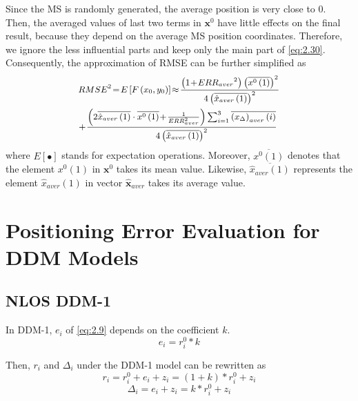 \documentclass[journal]{IEEEtran}
\begin{document}
Since the MS is randomly generated, the average position is very close to 0. Then, the averaged values of last two terms in $\mathbf{x}^0$ have little effects on the final result, because they depend on the average MS position coordinates. Therefore, we ignore the less influential parts and keep only the main part of \eqref{eq:2.30}. Consequently, the approximation of RMSE can be further simplified as
   \begin{equation}\label{eq:31}
      \begin{small}
      \begin{aligned}
      & RMSE^2 \!=\! E\left[F\left(x_0,y_0\right)\right]\!\approx\! \frac{\left( 1\!+\! {{ERR}_{aver}}^2\right) \left(\overline {x^0\left(1\right)}\right)^2}{4\left(\overline{\hat{x}_{aver}\left(1\right)}\right)^2}\\
     & \!+\!\frac{\left(2\overline{\hat{x}_{aver}\left(1\right)}\cdot\overline{x^0\left(1\right)}\!+\!\frac1{ERR_{aver}^2}\right)\sum_{i=1}^3\overline{\left(x_\Delta\right)_{aver}\left(i\right)}}{4\left(\overline{\hat{x}_{aver}\left(1\right)}\right)^2}
   \end{aligned}
\end{small}
   \end{equation}
where $E\left[{\bullet}\right]$ stands for expectation operations. Moreover, $\overline {x^0\left(1\right)} $ denotes that the element $x^0\left(1\right)$ in $\mathbf{x}^0$ takes its mean value. Likewise, $\overline {\hat{x}_{aver}\left(1\right)}$ represents the element $\hat{x}_{aver}\left(1\right)$ in vector $\hat{\mathbf{x}}_{aver}$ takes its average value.
\section{Positioning Error Evaluation for DDM Models}
\subsection{NLOS DDM-1}

In DDM-1, ${e_i}$ of \eqref{eq:2.9} depends on the coefficient $k$.
\begin{equation}\label{eq:2.32}
{{e}_{i}}={{r}_{i}^{0}}*k
\end{equation}

Then, $r_{i} $ and ${\Delta}_{i}$ under the DDM-1 model can be rewritten as
\begin{equation}\label{eq:2.33}
{r_i} = r_i^0 + {e_i} + {z_i} = \left(1+k\right)*{{r}_{i}^{0}}+{z_i}
 \end{equation}
 \begin{equation}\label{eq:2.341}
{{\Delta}_i} = {e_i} + {z_i} = k*{{r}_{i}^{0}}+{z_i}
 \end{equation}
\end{document}
